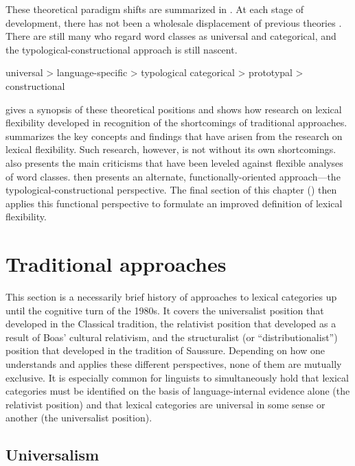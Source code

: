 These theoretical paradigm shifts are summarized in . At each stage of development, there has not been a wholesale displacement of previous theories . There are still many who regard word classes as universal and categorical, and the typological-constructional approach is still nascent.

\begin{exe}
  \ex\label{ex:2.1}
  \begin{xlist}
    \ex universal > language-specific > typological
    \ex categorical > prototypal > constructional
  \end{xlist}
\end{exe}

 gives a synopsis of these theoretical positions and shows how research on lexical flexibility developed in recognition of the shortcomings of traditional approaches.  summarizes the key concepts and findings that have arisen from the research on lexical flexibility. Such research, however, is not without its own shortcomings.  also presents the main criticisms that have been leveled against flexible analyses of word classes.  then presents an alternate, functionally-oriented approach—the typological-constructional perspective. The final section of this chapter () then applies this functional perspective to formulate an improved definition of lexical flexibility.

\section{Traditional approaches}
\label{sec:2.2}

This section is a necessarily brief history of approaches to lexical categories up until the cognitive turn of the 1980s. It covers the universalist position that developed in the Classical tradition, the relativist position that developed as a result of Boas' cultural relativism, and the structuralist (or \enquote{distributionalist}) position that developed in the tradition of Saussure. Depending on how one understands and applies these different perspectives, none of them are mutually exclusive. It is especially common for linguists to simultaneously hold that lexical categories must be identified on the basis of language-internal evidence alone (the relativist position) and that lexical categories are universal in some sense or another (the universalist position).

\subsection{Universalism}
\label{sec:2.2.1}

